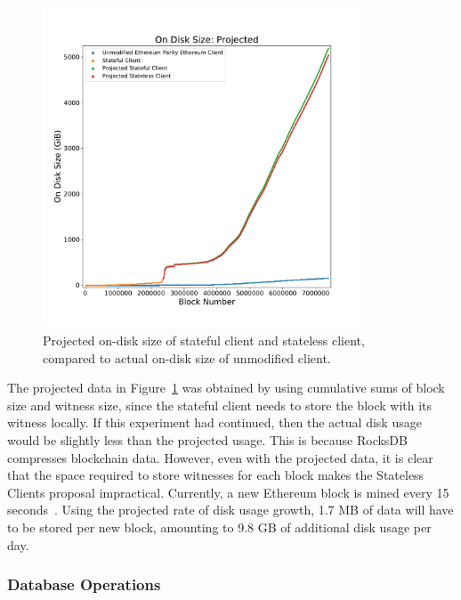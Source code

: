 \documentclass[12pt]{article}
\newcommand{\System}{Stateless Clients\xspace}
\newcommand{\figurewidth}{0.85\textwidth}
\begin{document}
\begin{figure}[H]
  \centering
  \includegraphics[width=\figurewidth]{../figures/results/graphs/background/projected-on-disk-size.pdf}
  \caption{Projected on-disk size of stateful client and stateless client, compared to actual on-disk size of unmodified client.}
  \label{fig:projectedondisksize}
\end{figure}

The projected data in Figure~\ref{fig:projectedondisksize} was obtained by using cumulative sums of block size and witness size, since the stateful client needs to store the block with its witness locally. If this experiment had continued, then the actual disk usage would be slightly less than the projected usage. This is because RocksDB compresses blockchain data. However, even with the projected data, it is clear that the space required to store witnesses for each block makes the \System proposal impractical. Currently, a new Ethereum block is mined every 15 seconds~\cite{ethereumblocktime}. Using the projected rate of disk usage growth, 1.7 MB of data will have to be stored per new block, amounting to 9.8 GB of additional disk usage per day.

\subsubsection{Database Operations}
\end{document}
